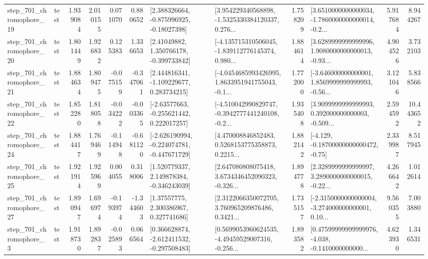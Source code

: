 \begin{tabular}{llrrrrllrlrr}
  step\_701\_chromophore\_19 &      test &      1.939084 &    2.010155 &      0.071070 &  0.880652 &    [2.388326664, -0.875996925, -0.18027398] &  [3.954229340568898, -1.5325330384120337, 0.276... &       1.758209 &  [3.6510000000000034, -1.7860000000000014, -0.2... &            5.917684 &          8.944267 \\
  step\_701\_chromophore\_20 &      test &      1.801449 &    1.926832 &      0.125383 &  1.336653 &     [2.41049882, 1.350766178, -0.399733842] &  [-4.135715310506045, -1.839112776145374, 0.980... &       1.884614 &  [3.6289999999999996, 1.9080000000000013, -0.93... &            4.904526 &          3.732103 \\
  step\_701\_chromophore\_21 &      test &      1.884634 &    1.809475 &     -0.075159 & -0.347061 &    [2.444816341, -1.109229677, 0.283734215] &  [-4.0454685993426995, 1.8633951941755043, -0.1... &       1.772000 &  [-3.646000000000001, 1.8569999999999993, -0.56... &            3.121046 &          5.838566 \\
  step\_701\_chromophore\_22 &      test &      1.852280 &    1.818058 &     -0.034222 & -0.003365 &    [-2.63577663, -0.255621442, 0.222017257] &  [-4.510042990829747, -0.3942777441240108, -0.2... &       1.935408 &  [3.9099999999999993, 0.392000000000003, -0.509... &            2.594592 &         10.443652 \\
  step\_701\_chromophore\_24 &      test &      1.884417 &    1.769469 &     -0.114948 & -0.681120 &  [-2.626190994, -0.224074781, -0.447671729] &  [4.470008846852483, 0.5268153775358873, 0.2215... &       1.882142 &              [-4.129, -0.18700000000000472, -0.75] &            2.339987 &          8.517945 \\
  step\_701\_chromophore\_25 &      test &      1.921914 &    1.925969 &      0.004055 &  0.318006 &    [1.520779337, 2.149878384, -0.346243039] &  [2.647080808075418, 3.6734346452090323, -0.326... &       1.894778 &  [2.3289999999999997, 3.2890000000000015, -0.22... &            4.266642 &          1.012614 \\
  step\_701\_chromophore\_27 &      test &      1.890947 &    1.696974 &     -0.193974 & -1.344603 &      [1.37557775, 2.300386967, 0.327741686] &  [2.3122066350072705, 3.760965209876486, 0.3421... &       1.735157 &  [-2.3150000000000004, -3.274000000000001, 0.10... &            9.560355 &          7.003880 \\
   step\_701\_chromophore\_3 &      test &      1.918730 &    1.892837 &     -0.025893 &  0.066564 &   [0.366628874, -2.612411532, -0.297508483] &  [0.5699053960624535, -4.49459529007316, -0.256... &       1.893582 &  [0.47599999999999976, -4.038, -0.1410000000000... &            4.623930 &          1.346531 \\

\end{tabular}
